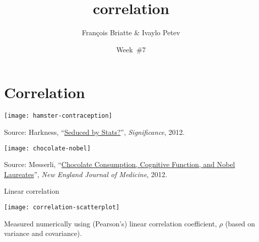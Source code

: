 \documentclass[t]{beamer}
\title{correlation}
\author{François Briatte \& Ivaylo Petev}
\date{Week~\#7}
\begin{document}
	
	
	\section{Correlation}

	\begin{frame}[c]

		\begin{center}
			\texttt{[image: hamster-contraception]}	
		\end{center}
		
		\vfill \par Source: Harkness, ``\href{http://onlinelibrary.wiley.com/doi/10.1111/j.1740-9713.2012.00549.x/abstract}{Seduced by Stats?}'', \emph{Significance}, 2012.
		
	\end{frame}

  
  \begin{frame}[c]

		\begin{center}
			\texttt{[image: chocolate-nobel]}
		\end{center}
		
		\vfill \par Source: Messerli, ``\href{http://www.nejm.org/doi/pdf/10.1056/NEJMon1211064}{Chocolate Consumption, Cognitive Function, and Nobel Laureates}'', \emph{New England Journal of Medicine}, 2012.
		
	\end{frame}

		
    \begin{frame}[c]{Linear correlation} %
	
		\begin{center}
			\texttt{[image: correlation-scatterplot]}
		\end{center}
    
    Measured numerically using (Pearson's) linear correlation coefficient, $\rho$ (based on variance and covariance).
				
	\end{frame}
	
\end{document}
